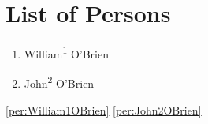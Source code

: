 \chapter{List of Persons}
\begin{enumerate}
	\item \label{per:William1OBrien} William\textsuperscript{1} O'Brien
	\item \label{per:John2OBrien} John\textsuperscript{2} O'Brien
\end{enumerate}

\ref{per:William1OBrien}
\ref{per:John2OBrien}
